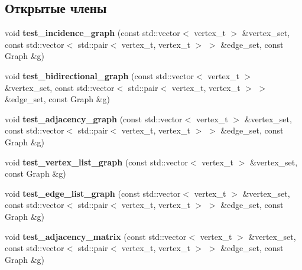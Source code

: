\subsection*{Открытые члены}
\begin{DoxyCompactItemize}
\item 
\mbox{\label{structboost_1_1graph__test_a1c7f7f3025d6523d3260544effcc8d35}} 
void {\bfseries test\+\_\+incidence\+\_\+graph} (const std\+::vector$<$ vertex\+\_\+t $>$ \&vertex\+\_\+set, const std\+::vector$<$ std\+::pair$<$ vertex\+\_\+t, vertex\+\_\+t $>$ $>$ \&edge\+\_\+set, const Graph \&g)
\item 
\mbox{\label{structboost_1_1graph__test_aab436d06abc494be6a64da18ec09ecb3}} 
void {\bfseries test\+\_\+bidirectional\+\_\+graph} (const std\+::vector$<$ vertex\+\_\+t $>$ \&vertex\+\_\+set, const std\+::vector$<$ std\+::pair$<$ vertex\+\_\+t, vertex\+\_\+t $>$ $>$ \&edge\+\_\+set, const Graph \&g)
\item 
\mbox{\label{structboost_1_1graph__test_ab01e5d59de01d3a2f7a756142c3daef3}} 
void {\bfseries test\+\_\+adjacency\+\_\+graph} (const std\+::vector$<$ vertex\+\_\+t $>$ \&vertex\+\_\+set, const std\+::vector$<$ std\+::pair$<$ vertex\+\_\+t, vertex\+\_\+t $>$ $>$ \&edge\+\_\+set, const Graph \&g)
\item 
\mbox{\label{structboost_1_1graph__test_a6cf2bad7292277561a091d605022de3e}} 
void {\bfseries test\+\_\+vertex\+\_\+list\+\_\+graph} (const std\+::vector$<$ vertex\+\_\+t $>$ \&vertex\+\_\+set, const Graph \&g)
\item 
\mbox{\label{structboost_1_1graph__test_ada50db1e8060efeb6ed21843d46b5eb4}} 
void {\bfseries test\+\_\+edge\+\_\+list\+\_\+graph} (const std\+::vector$<$ vertex\+\_\+t $>$ \&vertex\+\_\+set, const std\+::vector$<$ std\+::pair$<$ vertex\+\_\+t, vertex\+\_\+t $>$ $>$ \&edge\+\_\+set, const Graph \&g)
\item 
\mbox{\label{structboost_1_1graph__test_a0cfbd7948aba361ecaf9242add8fd3b4}} 
void {\bfseries test\+\_\+adjacency\+\_\+matrix} (const std\+::vector$<$ vertex\+\_\+t $>$ \&vertex\+\_\+set, const std\+::vector$<$ std\+::pair$<$ vertex\+\_\+t, vertex\+\_\+t $>$ $>$ \&edge\+\_\+set, const Graph \&g)

\end{DoxyCompactItemize}
